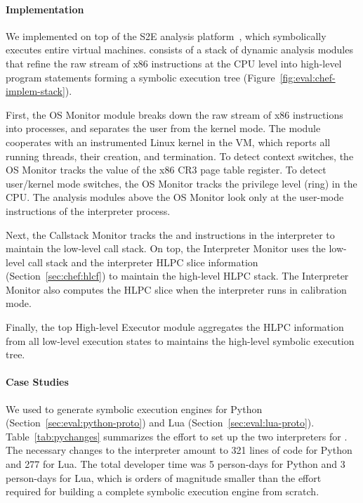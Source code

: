 \paragraph{Implementation}

We implemented \chef on top of the S2E analysis platform~\cite{s2eSystem}, which symbolically executes entire virtual machines.
%
\chef consists of a stack of dynamic analysis modules that refine the raw stream of x86 instructions at the CPU level into high-level program statements forming a symbolic execution tree (Figure~\ref{fig:eval:chef-implem-stack}).

First, the OS Monitor module breaks down the raw stream of x86 instructions into processes, and separates the user from the kernel mode.
%
The module cooperates with an instrumented Linux kernel in the VM, which reports all running threads, their creation, and termination.  To detect context switches, the OS Monitor tracks the value of the x86 CR3 page table register.  To detect user/kernel mode switches, the OS Monitor tracks the privilege level (ring) in the CPU.
%
The analysis modules above the OS Monitor look only at the user-mode instructions of the interpreter process.

Next, the Callstack Monitor tracks the  and  instructions in the interpreter to maintain the low-level call stack.
%
On top, the Interpreter Monitor uses the low-level call stack and the interpreter HLPC slice information (Section~\ref{sec:chef:hlcf}) to maintain the high-level HLPC stack.
%
The Interpreter Monitor also computes the HLPC slice when the interpreter runs in calibration mode.

Finally, the top High-level Executor module aggregates the HLPC information from all low-level execution states to maintains the high-level symbolic execution tree.


\paragraph{Case Studies}

We used \chef to generate symbolic execution engines for Python (Section~\ref{sec:eval:python-proto}) and Lua (Section~\ref{sec:eval:lua-proto}). Table~\ref{tab:pychanges} summarizes the effort to set up the two interpreters for \chef.  The necessary changes to the interpreter amount to 321 lines of code for Python and 277 for Lua.
%
The total developer time was 5 person-days for Python and 3 person-days for Lua, which is orders of magnitude smaller than the effort required for building a complete symbolic execution engine from scratch.  

